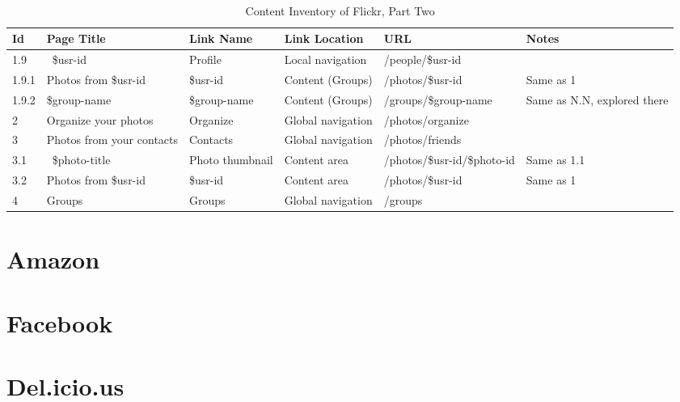 \documentclass[12pt,a4paper]{article}
\begin{document}
\begin{landscape}
  \begin{table}[h!b!p!]
    \caption{Content Inventory of Flickr, Part Two}
    \label{table:content.inventory.flickr.2}
    \begin{center}
      \begin{tiny}
        \tt
        \begin{tabular}{l|l|l|l|l|p{3cm}}
            Id &
            Page Title &
            Link Name &
            Link Location &
            URL &
            Notes \\

            \hline

              1.9 &
              ~\$usr-id &
              Profile &
              Local navigation &
              /people/\$usr-id &
              \\

                1.9.1 &
                Photos from \$usr-id &
                \$usr-id &
                Content (Groups) &
                /photos/\$usr-id &
                Same as 1 \\

                1.9.2 &
                \$group-name &
                \$group-name &
                Content (Groups) &
                /groups/\$group-name &
                Same as N.N, explored there \\

            2 &
            Organize your photos &
            Organize &
            Global navigation &
            /photos/organize &
            \\

            3 &
            Photos from your contacts &
            Contacts &
            Global navigation &
            /photos/friends &
            \\

              3.1 &
              ~\$photo-title &
              Photo thumbnail &
              Content area &
              /photos/\$usr-id/\$photo-id &
              Same as 1.1 \\

              3.2 &
              Photos from \$usr-id &
              \$usr-id &
              Content area &
              /photos/\$usr-id &
              Same as 1 \\

            4 &
            Groups &
            Groups &
            Global navigation &
            /groups &
            \\




          \end{tabular}
        \rm
      \end{tiny}
    \end{center}
  \end{table}
\end{landscape}

\section{Amazon}

\section{Facebook}

\section{Del.icio.us}
\end{document}
